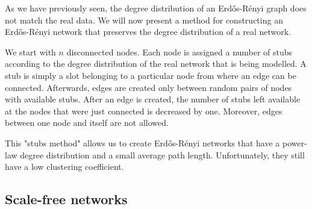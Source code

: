 As we have previously seen, the degree distribution of an Erd\H{o}s-R\'{e}nyi graph
does not match the real data. We will now present a method for constructing an
Erd\H{o}s-R\'{e}nyi network that preserves the degree distribution of a real network. 

We start with $n$ disconnected nodes. Each node is assigned a number of stubs 
according to the degree distribution of the real network that is being
modelled. A stub is simply a slot belonging to a particular node from where an edge can 
be connected. Afterwards, edges are created only between random pairs of nodes with
available stubs. After an edge is created, the number of stubs left available
at the nodes that were just connected is decreased by one. Moreover, edges
between one node and itself are not allowed.

This "stubs method" allows us to create Erd\H{o}s-R\'{e}nyi networks that have a power-law
degree distribution and a small average path length. Unfortunately, they still
have a low clustering coefficient.

\subsection{Scale-free networks}

